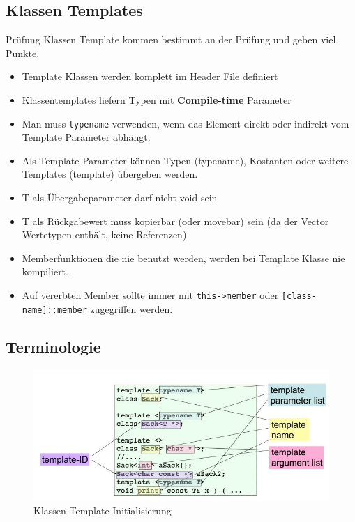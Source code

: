 \clearpage


\subsection{Klassen Templates}
\begin{hint}{Prüfung}{}
	Klassen Template kommen bestimmt an der Prüfung und geben viel Punkte.
\end{hint}
\begin{itemize}
	\item Template Klassen werden komplett im Header File definiert
	\item Klassentemplates liefern Typen mit \textbf{Compile-time} Parameter
	\item Man muss \lstinline|typename| verwenden, wenn das Element direkt oder indirekt vom Template Parameter abhängt.
	\item Als Template Parameter können Typen (typename), Kostanten oder weitere Templates (template) übergeben werden.
	\item T als Übergabeparameter darf nicht void sein
	\item T als Rückgabewert muss kopierbar (oder movebar) sein	(da der Vector Wertetypen enthält, keine Referenzen)
	\item Memberfunktionen die nie benutzt werden, werden bei Template Klasse nie kompiliert.
	\item Auf vererbten Member sollte immer mit \lstinline|this->member| oder \lstinline|[class-name]::member| zugegriffen werden.
\end{itemize}

\subsection{Terminologie}
\begin{figure}[h]
	\centering
	\includegraphics[width=0.7\linewidth]{images/class_template_terminologie}
	\caption{Klassen Template Initialisierung}
	\label{fig:classtemplateterminologie}
\end{figure}

